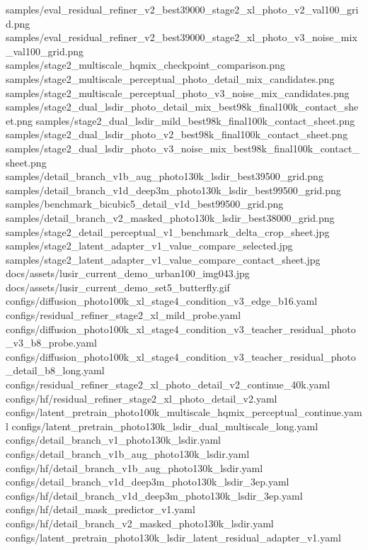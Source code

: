 \documentclass[
  10pt,
]{article}
\newenvironment{Shaded}{}{}
\newcommand{\NormalTok}[1]{#1}
\begin{document}
\begin{Shaded}
\begin{Highlighting}[]
\NormalTok{samples/eval\_residual\_refiner\_v2\_best39000\_stage2\_xl\_photo\_v2\_val100\_grid.png}
\NormalTok{samples/eval\_residual\_refiner\_v2\_best39000\_stage2\_xl\_photo\_v3\_noise\_mix\_val100\_grid.png}
\NormalTok{samples/stage2\_multiscale\_hqmix\_checkpoint\_comparison.png}
\NormalTok{samples/stage2\_multiscale\_perceptual\_photo\_detail\_mix\_candidates.png}
\NormalTok{samples/stage2\_multiscale\_perceptual\_photo\_v3\_noise\_mix\_candidates.png}
\NormalTok{samples/stage2\_dual\_lsdir\_photo\_detail\_mix\_best98k\_final100k\_contact\_sheet.png}
\NormalTok{samples/stage2\_dual\_lsdir\_mild\_best98k\_final100k\_contact\_sheet.png}
\NormalTok{samples/stage2\_dual\_lsdir\_photo\_v2\_best98k\_final100k\_contact\_sheet.png}
\NormalTok{samples/stage2\_dual\_lsdir\_photo\_v3\_noise\_mix\_best98k\_final100k\_contact\_sheet.png}
\NormalTok{samples/detail\_branch\_v1b\_aug\_photo130k\_lsdir\_best39500\_grid.png}
\NormalTok{samples/detail\_branch\_v1d\_deep3m\_photo130k\_lsdir\_best99500\_grid.png}
\NormalTok{samples/benchmark\_bicubic5\_detail\_v1d\_best99500\_grid.png}
\NormalTok{samples/detail\_branch\_v2\_masked\_photo130k\_lsdir\_best38000\_grid.png}
\NormalTok{samples/stage2\_detail\_perceptual\_v1\_benchmark\_delta\_crop\_sheet.jpg}
\NormalTok{samples/stage2\_latent\_adapter\_v1\_value\_compare\_selected.jpg}
\NormalTok{samples/stage2\_latent\_adapter\_v1\_value\_compare\_contact\_sheet.jpg}
\NormalTok{docs/assets/lusir\_current\_demo\_urban100\_img043.jpg}
\NormalTok{docs/assets/lusir\_current\_demo\_set5\_butterfly.gif}
\NormalTok{configs/diffusion\_photo100k\_xl\_stage4\_condition\_v3\_edge\_b16.yaml}
\NormalTok{configs/residual\_refiner\_stage2\_xl\_mild\_probe.yaml}
\NormalTok{configs/diffusion\_photo100k\_xl\_stage4\_condition\_v3\_teacher\_residual\_photo\_v3\_b8\_probe.yaml}
\NormalTok{configs/diffusion\_photo100k\_xl\_stage4\_condition\_v3\_teacher\_residual\_photo\_detail\_b8\_long.yaml}
\NormalTok{configs/residual\_refiner\_stage2\_xl\_photo\_detail\_v2\_continue\_40k.yaml}
\NormalTok{configs/hf/residual\_refiner\_stage2\_xl\_photo\_detail\_v2.yaml}
\NormalTok{configs/latent\_pretrain\_photo100k\_multiscale\_hqmix\_perceptual\_continue.yaml}
\NormalTok{configs/latent\_pretrain\_photo130k\_lsdir\_dual\_multiscale\_long.yaml}
\NormalTok{configs/detail\_branch\_v1\_photo130k\_lsdir.yaml}
\NormalTok{configs/detail\_branch\_v1b\_aug\_photo130k\_lsdir.yaml}
\NormalTok{configs/hf/detail\_branch\_v1b\_aug\_photo130k\_lsdir.yaml}
\NormalTok{configs/detail\_branch\_v1d\_deep3m\_photo130k\_lsdir\_3ep.yaml}
\NormalTok{configs/hf/detail\_branch\_v1d\_deep3m\_photo130k\_lsdir\_3ep.yaml}
\NormalTok{configs/hf/detail\_mask\_predictor\_v1.yaml}
\NormalTok{configs/hf/detail\_branch\_v2\_masked\_photo130k\_lsdir.yaml}
\NormalTok{configs/latent\_pretrain\_photo130k\_lsdir\_latent\_residual\_adapter\_v1.yaml}
\end{Highlighting}
\end{Shaded}
\end{document}
